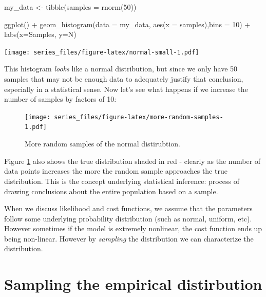 \documentclass[
]{book}
\newenvironment{Shaded}{\begin{snugshade}}{\end{snugshade}}
\newcommand{\AttributeTok}[1]{\textcolor[rgb]{0.77,0.63,0.00}{#1}}
\newcommand{\DecValTok}[1]{\textcolor[rgb]{0.00,0.00,0.81}{#1}}
\newcommand{\FunctionTok}[1]{\textcolor[rgb]{0.00,0.00,0.00}{#1}}
\newcommand{\NormalTok}[1]{#1}
\newcommand{\OtherTok}[1]{\textcolor[rgb]{0.56,0.35,0.01}{#1}}
\newcommand{\SpecialCharTok}[1]{\textcolor[rgb]{0.00,0.00,0.00}{#1}}
\newcommand{\StringTok}[1]{\textcolor[rgb]{0.31,0.60,0.02}{#1}}
\theoremstyle{definition}
\theoremstyle{definition}
\theoremstyle{definition}
\theoremstyle{remark}
\begin{document}
\begin{Shaded}
\begin{Highlighting}[]
\NormalTok{my\_data }\OtherTok{\textless{}{-}} \FunctionTok{tibble}\NormalTok{(}\AttributeTok{samples =} \FunctionTok{rnorm}\NormalTok{(}\DecValTok{50}\NormalTok{))}

\FunctionTok{ggplot}\NormalTok{() }\SpecialCharTok{+} 
  \FunctionTok{geom\_histogram}\NormalTok{(}\AttributeTok{data =}\NormalTok{ my\_data, }\FunctionTok{aes}\NormalTok{(}\AttributeTok{x =}\NormalTok{ samples),}\AttributeTok{bins =} \DecValTok{10}\NormalTok{) }\SpecialCharTok{+}
  \FunctionTok{labs}\NormalTok{(}\AttributeTok{x=}\StringTok{\textquotesingle{}Samples\textquotesingle{}}\NormalTok{,}
       \AttributeTok{y=}\StringTok{\textquotesingle{}N\textquotesingle{}}\NormalTok{)}
\end{Highlighting}
\end{Shaded}

\texttt{[image: series\_files/figure-latex/normal-small-1.pdf]}

This histogram \emph{looks} like a normal distribution, but since we only have 50 samples that may not be enough data to adequately justify that conclusion, especially in a statistical sense. Now let's see what happens if we increase the number of samples by factors of 10:

\begin{figure}
\centering
\texttt{[image: series\_files/figure-latex/more-random-samples-1.pdf]}
\caption{\label{fig:more-random-samples}More random samples of the normal distirubtion.}
\end{figure}

Figure \ref{fig:more-random-samples} also shows the true distribution shaded in red - clearly as the number of data points increases the more the random sample approaches the true distribution. This is the concept underlying statistical inference: process of drawing conclusions about the entire population based on a sample.

When we discuss likelihood and cost functions, we assume that the parameters follow some underlying probability distribution (such as normal, uniform, etc). However sometimes if the model is extremely nonlinear, the cost function ends up being non-linear. However by \emph{sampling} the distribution we can characterize the distribution.

\hypertarget{sampling-the-empirical-distirbution}{%
\section{Sampling the empirical distirbution}\label{sampling-the-empirical-distirbution}}
\end{document}
